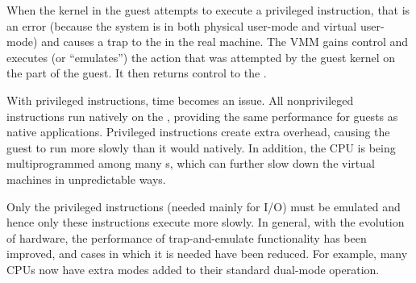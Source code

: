 When the kernel in the guest attempts to execute a privileged instruction, that is an error (because the system is in both physical user-mode and virtual user-mode) and causes a trap to the  in the real machine.
The VMM gains control and executes (or ``emulates'') the action that was attempted by the guest kernel on the part of the guest.
It then returns control to the .

With privileged instructions, time becomes an issue.
All nonprivileged instructions run natively on the , providing the same performance for guests as native applications.
Privileged instructions create extra overhead, causing the guest to run more slowly than it would natively.
In addition, the CPU is being multiprogrammed among many s, which can further slow down the virtual machines in unpredictable ways.

Only the privileged instructions (needed mainly for I/O) must be emulated and hence only these instructions execute more slowly.
In general, with the evolution of hardware, the performance of trap-and-emulate functionality has been improved, and cases in which it is needed have been reduced.
For example, many CPUs now have extra modes added to their standard dual-mode operation.


